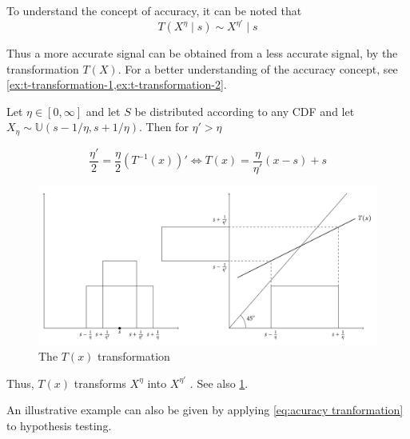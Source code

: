 \documentclass[10pt,a4paper]{article} 					%
\begin{document}
To understand the concept of accuracy, it can be noted that
\[
	T(X^{\eta}\mid s)\sim X^{\eta'}\mid s
\]

Thus a more accurate signal can be obtained from a less accurate signal, by the transformation $T(X)$. For a better understanding of the accuracy concept, see \cref{ex:t-transformation-1,ex:t-transformation-2}.

\begin{example}\label{ex:t-transformation-1}
Let  $\eta\in[0,\infty]$ and let $S$ be distributed according to any CDF and let $X_{\eta}\sim\mathbb{U}(s-1/\eta,s+1/\eta)$. Then for $\eta'>\eta$

\[
\frac{\eta'}{2}=\frac{\eta}{2}\left(T^{-1}(x)\right)'\Leftrightarrow T(x)=\frac{\eta}{\eta'}(x-s)+s
\]

\begin{figure}
	\includegraphics[width=\textwidth]{../fig/t-transformation.pdf}
	\caption{\label{fig:t-transformation}The $T(x)$ transformation}
\end{figure}

Thus, $T(x)$ transforms $X^{\eta}$ into $X^{\eta'}$ \citep{Persico1996}. See also \cref{fig:t-transformation}.
\end{example}
An illustrative example can also be given by applying \cref{eq:acuracy tranformation} to hypothesis testing.
\end{document}
